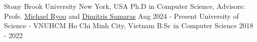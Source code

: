 \begin{educations}
\education
    {Stony Brook University}   {New York, USA}
    {Ph.D in Computer Science, Advisors: Profs. \href{http://michaelryoo.com/}{Michael Ryoo} and \href{https://scholar.google.com/citations?user=BxbKTYkAAAAJ}{Dimitris Samaras}} {Aug 2024 - Present}
 \emptySeparator
\education
    {University of Science - VNUHCM}   {Ho Chi Minh City, Vietnam}
    {B.Sc in Computer Science} {2018 - 2022}
 
\end{educations}
\vspace{-3mm}
